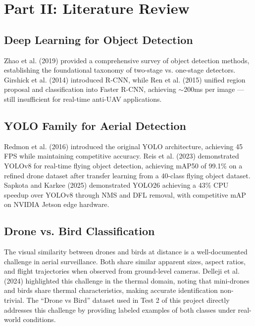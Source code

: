 \documentclass[12pt,a4paper]{report}
\begin{document}
\section{Part II: Literature Review}

\subsection{Deep Learning for Object Detection}

Zhao et al. (2019) \cite{zhao2019object} provided a comprehensive survey of
object detection methods, establishing the foundational taxonomy of two-stage
vs. one-stage detectors. Girshick et al. (2014) \cite{girshick2014rcnn} introduced
R-CNN, while Ren et al. (2015) \cite{ren2015fasterrcnn} unified region proposal
and classification into Faster R-CNN, achieving $\sim$200ms per image — still
insufficient for real-time anti-UAV applications.

\subsection{YOLO Family for Aerial Detection}

Redmon et al. (2016) \cite{redmon2016yolo} introduced the original YOLO
architecture, achieving 45 FPS while maintaining competitive accuracy. Reis et al.
(2023) \cite{reis2023yolov8flying} demonstrated YOLOv8 for real-time flying object
detection, achieving mAP50 of 99.1\% on a refined drone dataset after transfer
learning from a 40-class flying object dataset. Sapkota and Karkee (2025)
\cite{sapkota2025yolo26} demonstrated YOLO26 achieving a 43\% CPU speedup over
YOLOv8 through NMS and DFL removal, with competitive mAP on NVIDIA Jetson edge
hardware.

\subsection{Drone vs. Bird Classification}

The visual similarity between drones and birds at distance is a well-documented
challenge in aerial surveillance. Both share similar apparent sizes, aspect ratios,
and flight trajectories when observed from ground-level cameras. Delleji et al.
(2024) \cite{delleji2024thermal} highlighted this challenge in the thermal domain,
noting that mini-drones and birds share thermal characteristics, making accurate
identification non-trivial. The ``Drone vs Bird'' dataset used in Test 2 of this
project directly addresses this challenge by providing labeled examples of both
classes under real-world conditions.
\end{document}
